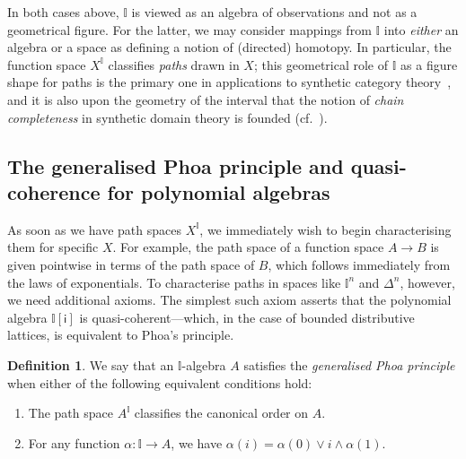 \documentclass[a4paper,12pt]{amsart}
\theoremstyle{definition}
\newtheorem{definition}[theorem]{Definition}
\newcommand{\mbb}[1]{\mathbb{#1}}
\newcommand{\I}{\mbb I}
\newcommand{\ms}[1]{\mathsf{#1}}
\begin{document}
In both cases above, $\I$ is viewed as an algebra of observations and not as a geometrical figure. For the latter, we may consider mappings from $\I$ into \emph{either} an algebra or a space as defining a notion of (directed) homotopy. In particular, the function space $X^\I$ classifies \emph{paths} drawn in $X$; this geometrical role of $\I$ as a figure shape for paths is the primary one in applications to synthetic category theory~\citep{riehl2017type}, and it is also upon the geometry of the interval that the notion of \emph{chain completeness} in synthetic domain theory is founded (cf.\ ).

\subsection{The generalised Phoa principle and quasi-coherence for polynomial algebras}

As soon as we have path spaces $X^\I$, we immediately wish to begin characterising them for specific $X$. For example, the path space of a function space $A\to B$ is given pointwise in terms of the path space of $B$, which follows immediately from the laws of exponentials. To characterise paths in spaces like $\I^n$ and $\Delta^n$, however, we need additional axioms. The simplest such axiom asserts that the polynomial algebra $\I[\ms{i}]$ is quasi-coherent—which, in the case of bounded distributive lattices, is equivalent to Phoa's principle.

\begin{definition}
  We say that an $\I$-algebra $A$ satisfies the \emph{generalised Phoa principle} when either of the following equivalent conditions hold:
  \begin{enumerate}
    \item The path space $A^\I$ classifies the canonical order on $A$.
    \item For any function $\alpha\colon \I\to A$, we have $\alpha(i) = \alpha(0)\vee i \wedge \alpha(1)$.
  \end{enumerate}
\end{definition}
\end{document}

